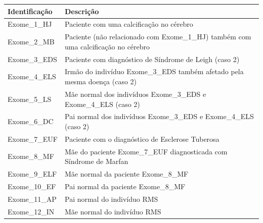 {\begin{landscape}
\begin{table}[p]
{    \begin{tabular}{|p{3cm}|p{11cm}|}
    \hline
    \textbf{Identificação}               & \textbf{Descrição}                                                                                   \\ \hline
    Exome\_1\_HJ                         & Paciente com uma calcificação no cérebro                                                    \\ \hline
    Exome\_2\_MB                         & Paciente (não relacionado com Exome\_1\_HJ) também com uma calcificação no cérebro \\ \hline
    Exome\_3\_EDS                        & Paciente com diagnóstico de Síndrome de Leigh (caso 2)                                  \\ \hline
    Exome\_4\_ELS                        & Irmão do indivíduo Exome\_3\_EDS também afetado pela mesma doença (caso 2)                                               \\ \hline
    Exome\_5\_LS                         & Mãe normal dos indivíduos Exome\_3\_EDS e Exome\_4\_ELS (caso 2)                                               \\ \hline
    Exome\_6\_DC                         & Pai normal dos indivíduos Exome\_3\_EDS e Exome\_4\_ELS (caso 2)                                               \\ \hline
    Exome\_7\_EUF                        & Paciente com o diagnóstico de Esclerose Tuberosa                                            \\ \hline
    Exome\_8\_MF                         & Mãe do paciente Exome\_7\_EUF diagnosticada com Síndrome de Marfan \\ \hline
    Exome\_9\_ELF                        & Mãe normal da paciente Exome\_8\_MF                                                                  \\ \hline
    Exome\_10\_EF                        & Pai normal da paciente Exome\_8\_MF                                                                  \\ \hline
    Exome\_11\_AP                        & Pai normal do indivíduo RMS                                                                        \\ \hline
    Exome\_12\_IN                        & Mãe normal do indivíduo RMS                                                                        \\ \hline
    \end{tabular}
}    
\end{table}
\end{landscape}

\clearpage
}

